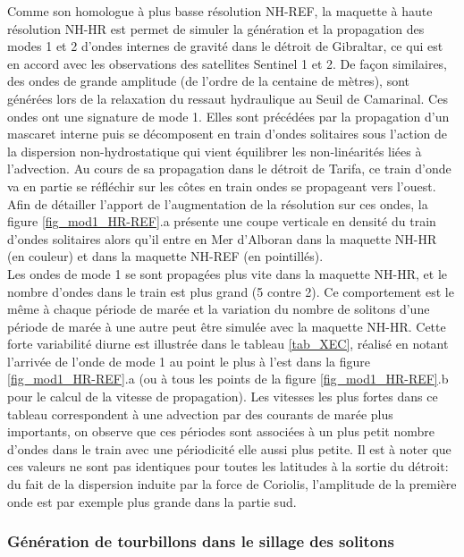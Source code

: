 Comme son homologue à plus basse résolution NH-REF, la maquette à haute résolution NH-HR est permet de simuler la génération et la propagation des modes 1 et 2 d'ondes internes de gravité dans le détroit de Gibraltar, ce qui est en accord avec les observations des satellites Sentinel 1 et 2. De façon similaires, des ondes de grande amplitude (de l'ordre de la centaine de mètres), sont générées lors de la relaxation du ressaut hydraulique au Seuil de Camarinal. Ces ondes ont une signature de mode 1. Elles sont précédées par la propagation d'un mascaret interne puis se décomposent en train d'ondes solitaires sous l'action de la dispersion non-hydrostatique qui vient équilibrer les non-linéarités liées à l'advection. Au cours de sa propagation dans le détroit de Tarifa, ce train d'onde va en partie se réfléchir sur les côtes en train ondes se propageant vers l'ouest. Afin de détailler l'apport de l'augmentation de la résolution sur ces ondes, la figure \ref{fig_mod1_HR-REF}.a présente une coupe verticale en densité du train d'ondes solitaires alors qu'il entre en Mer d'Alboran dans la maquette NH-HR (en couleur) et dans la maquette NH-REF (en pointillés). \\
Les ondes de mode 1 se sont propagées plus vite dans la maquette NH-HR, et le nombre d'ondes dans le train est plus grand (5 contre 2). Ce comportement est le même à chaque période de marée et la variation du nombre de solitons d'une période de marée à une autre peut être simulée avec la maquette NH-HR. Cette forte variabilité diurne est illustrée dans le tableau \ref{tab_XEC}, réalisé en notant l'arrivée de l'onde de mode 1 au point le plus à l'est dans la figure \ref{fig_mod1_HR-REF}.a (ou à tous les points de la figure \ref{fig_mod1_HR-REF}.b pour le calcul de la vitesse de propagation). Les vitesses les plus fortes dans ce tableau correspondent à une advection par des courants de marée plus importants, on observe que ces périodes sont associées à un plus petit nombre d'ondes dans le train avec une périodicité elle aussi plus petite. Il est à noter que ces valeurs ne sont pas identiques pour toutes les latitudes à la sortie du détroit: du fait de la dispersion induite par la force de Coriolis, l'amplitude de la première onde est par exemple plus grande dans la partie sud.








\subsubsection{Génération de tourbillons dans le sillage des solitons}

